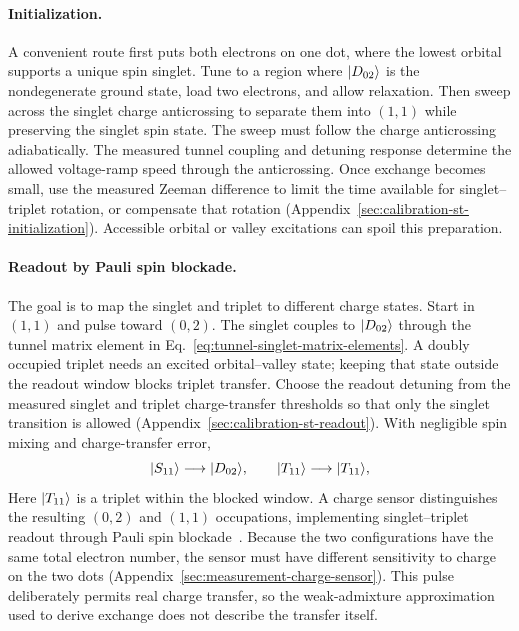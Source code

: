 \paragraph{Initialization.}
A convenient route first puts both electrons on one dot, where the
lowest orbital supports a unique spin singlet. Tune to a region
where $\lvert D_{02}\rangle$ is the nondegenerate ground state, load two
electrons, and allow relaxation. Then sweep across the singlet
charge anticrossing to separate them into $(1,1)$ while preserving
the singlet spin state. The sweep must follow the charge anticrossing adiabatically.
The measured tunnel coupling and detuning response determine the
allowed voltage-ramp speed through the anticrossing. Once exchange
becomes small, use the measured Zeeman difference to limit the time
available for singlet--triplet rotation, or compensate that rotation
(Appendix~\ref{sec:calibration-st-initialization}).
Accessible orbital or valley excitations can spoil this preparation.

\paragraph{Readout by Pauli spin blockade.}
The goal is to map the singlet and triplet to different charge states. Start in $(1,1)$ and
pulse toward $(0,2)$.
The singlet couples to $\lvert D_{02}\rangle$ through the tunnel matrix
element in Eq.~\eqref{eq:tunnel-singlet-matrix-elements}.
A doubly occupied triplet needs an excited orbital--valley state;
keeping that state outside the readout window blocks triplet transfer.
Choose the readout detuning from the measured singlet and triplet
charge-transfer thresholds so that only the singlet transition is
allowed (Appendix~\ref{sec:calibration-st-readout}).
With negligible spin mixing and charge-transfer error,
\begin{equation}
  \ket{S_{11}}\longrightarrow\ket{D_{02}},\qquad
  \ket{T_{11}}\longrightarrow\ket{T_{11}},
  \label{eq:pauli-readout-map}
\end{equation}
Here $\lvert T_{11}\rangle$ is a triplet within the blocked window.
A charge sensor distinguishes the resulting $(0,2)$ and $(1,1)$
occupations, implementing singlet--triplet readout through
Pauli spin blockade~\cite{Wu2014}.
Because the two configurations have the same total electron number,
the sensor must have different sensitivity to charge on the two
dots (Appendix~\ref{sec:measurement-charge-sensor}).
This pulse deliberately permits real charge transfer, so the
weak-admixture approximation used to derive exchange does not
describe the transfer itself.

